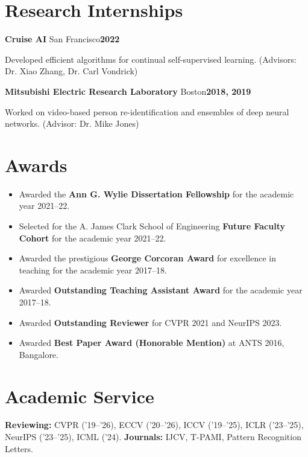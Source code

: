 \documentclass[10pt, letterpaper]{article}
\newcommand{\datepill}[1]{{\setlength{\fboxsep}{2pt}\colorbox{accent!10}{\small\color{accent}\bfseries #1}}}
\newcommand{\intern}[5]{\textbf{#1} \textperiodcentered{} #2\hfill\datepill{#3}\par{\leftskip=0.5cm #5 {\color{muted}\small(#4)}\par}\vspace{0.15cm}}
\begin{document}
\section{Research Internships}
\intern{Cruise AI}{San Francisco}{2022}{Advisors: Dr. Xiao Zhang, Dr. Carl Vondrick}{Developed efficient algorithms for continual self-supervised learning.}
\intern{Mitsubishi Electric Research Laboratory}{Boston}{2018, 2019}{Advisor: Dr. Mike Jones}{Worked on video-based person re-identification and ensembles of deep neural networks.}
\section{Awards}
\begin{itemize}[leftmargin=0.4cm, topsep=0pt, itemsep=0pt, parsep=0pt, label={\color{accent}\small$\blacktriangleright$}]
\item Awarded the \textbf{Ann G. Wylie Dissertation Fellowship} for the academic year 2021--22.
\item Selected for the A. James Clark School of Engineering \textbf{Future Faculty Cohort} for the academic year 2021--22.
\item Awarded the prestigious \textbf{George Corcoran Award} for excellence in teaching for the academic year 2017--18.
\item Awarded \textbf{Outstanding Teaching Assistant Award} for the academic year 2017--18.
\item Awarded \textbf{Outstanding Reviewer} for CVPR 2021 and NeurIPS 2023.
\item Awarded \textbf{Best Paper Award (Honorable Mention)} at ANTS 2016, Bangalore.
\end{itemize}
\section{Academic Service}
\textbf{Reviewing:} CVPR ('19--'26), ECCV ('20--'26), ICCV ('19--'25), ICLR ('23--'25), NeurIPS ('23--'25), ICML ('24). \textbf{Journals:} IJCV, T-PAMI, Pattern Recognition Letters.
\end{document}
